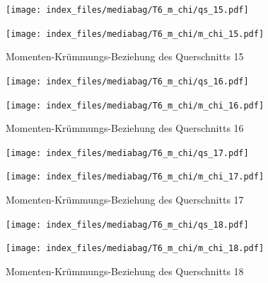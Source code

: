 \documentclass[
  11pt,
  letterpaper,
]{scrreprt}
\begin{document}
\begin{figure}[H]

\begin{minipage}{0.50\linewidth}
\texttt{[image: index\_files/mediabag/T6\_m\_chi/qs\_15.pdf]}\end{minipage}%
%
\begin{minipage}{0.50\linewidth}
\texttt{[image: index\_files/mediabag/T6\_m\_chi/m\_chi\_15.pdf]}\end{minipage}%

\caption{\label{fig-m_chi_appendix}Momenten-Krümmungs-Beziehung des
Querschnitts 15}

\end{figure}%

\begin{figure}[H]

\begin{minipage}{0.50\linewidth}
\texttt{[image: index\_files/mediabag/T6\_m\_chi/qs\_16.pdf]}\end{minipage}%
%
\begin{minipage}{0.50\linewidth}
\texttt{[image: index\_files/mediabag/T6\_m\_chi/m\_chi\_16.pdf]}\end{minipage}%

\caption{\label{fig-m_chi_appendix}Momenten-Krümmungs-Beziehung des
Querschnitts 16}

\end{figure}%

\begin{figure}[H]

\begin{minipage}{0.50\linewidth}
\texttt{[image: index\_files/mediabag/T6\_m\_chi/qs\_17.pdf]}\end{minipage}%
%
\begin{minipage}{0.50\linewidth}
\texttt{[image: index\_files/mediabag/T6\_m\_chi/m\_chi\_17.pdf]}\end{minipage}%

\caption{\label{fig-m_chi_appendix}Momenten-Krümmungs-Beziehung des
Querschnitts 17}

\end{figure}%

\begin{figure}[H]

\begin{minipage}{0.50\linewidth}
\texttt{[image: index\_files/mediabag/T6\_m\_chi/qs\_18.pdf]}\end{minipage}%
%
\begin{minipage}{0.50\linewidth}
\texttt{[image: index\_files/mediabag/T6\_m\_chi/m\_chi\_18.pdf]}\end{minipage}%

\caption{\label{fig-m_chi_appendix}Momenten-Krümmungs-Beziehung des
Querschnitts 18}

\end{figure}%
\end{document}
